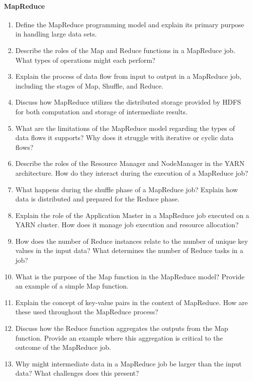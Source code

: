 \paragraph*{MapReduce}
\begin{enumerate}
	\item Define the MapReduce programming model and explain its primary purpose in handling large data sets.
	\item Describe the roles of the Map and Reduce functions in a MapReduce job. What types of operations might each perform?
	\item Explain the process of data flow from input to output in a MapReduce job, including the stages of Map, Shuffle, and Reduce.
	\item Discuss how MapReduce utilizes the distributed storage provided by HDFS for both computation and storage of intermediate results.
	\item What are the limitations of the MapReduce model regarding the types of data flows it supports? Why does it struggle with iterative or cyclic data flows?
	\item Describe the roles of the Resource Manager and NodeManager in the YARN architecture. How do they interact during the execution of a MapReduce job?
	\item What happens during the shuffle phase of a MapReduce job? Explain how data is distributed and prepared for the Reduce phase.
	\item Explain the role of the Application Master in a MapReduce job executed on a YARN cluster. How does it manage job execution and resource allocation?
	\item How does the number of Reduce instances relate to the number of unique key values in the input data? What determines the number of Reduce tasks in a job?
	\item What is the purpose of the Map function in the MapReduce model? Provide an example of a simple Map function.
	\item Explain the concept of key-value pairs in the context of MapReduce. How are these used throughout the MapReduce process?
	\item Discuss how the Reduce function aggregates the outputs from the Map function. Provide an example where this aggregation is critical to the outcome of the MapReduce job.
	\item Why might intermediate data in a MapReduce job be larger than the input data? What challenges does this present?
\end{enumerate}
